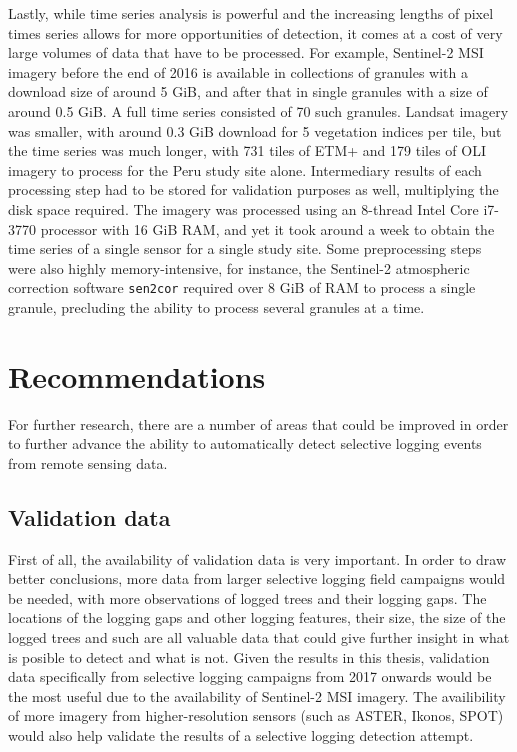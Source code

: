 \documentclass[a4paper,12pt]{scrbook}
\begin{document}
Lastly, while time series analysis is powerful and the increasing lengths of pixel times series allows for more opportunities of detection, it comes at a cost of very large volumes of data that have to be processed. For example, Sentinel-2 \ac{MSI} imagery before the end of 2016 is available in collections of granules with a download size of around 5 \ac{GiB}, and after that in single granules with a size of around 0.5 \ac{GiB}. A full time series consisted of 70 such granules. Landsat imagery was smaller, with around 0.3 \ac{GiB} download for 5 vegetation indices per tile, but the time series was much longer, with 731 tiles of \ac{ETM+} and 179 tiles of \ac{OLI} imagery to process for the Peru study site alone. Intermediary results of each processing step had to be stored for validation purposes as well, multiplying the disk space required. The imagery was processed using an 8-thread Intel Core i7-3770 processor with 16 \ac{GiB} \ac{RAM}, and yet it took around a week to obtain the time series of a single sensor for a single study site. Some preprocessing steps were also highly memory-intensive, for instance, the Sentinel-2 atmospheric correction software \texttt{sen2cor} required over 8 \ac{GiB} of \ac{RAM} to process a single granule, precluding the ability to process several granules at a time.

\section{Recommendations}

For further research, there are a number of areas that could be improved in order to further advance the ability to automatically detect selective logging events from remote sensing data.

\subsection{Validation data}

First of all, the availability of validation data is very important. In order to draw better conclusions, more data from larger selective logging field campaigns would be needed, with more observations of logged trees and their logging gaps. The locations of the logging gaps and other logging features, their size, the size of the logged trees and such are all valuable data that could give further insight in what is posible to detect and what is not. Given the results in this thesis, validation data specifically from selective logging campaigns from 2017 onwards would be the most useful due to the availability of Sentinel-2 \ac{MSI} imagery. The availibility of more imagery from higher-resolution sensors (such as ASTER, Ikonos, SPOT) would also help validate the results of a selective logging detection attempt.
\end{document}
